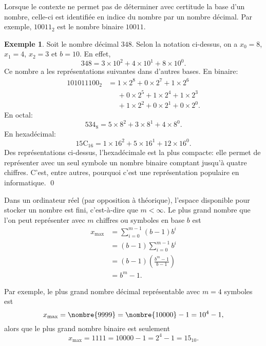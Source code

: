 \documentclass[letterpaper,11pt]{memoir}
\theoremstyle{plain}
\theoremstyle{definition}
\newtheorem{exemple}{Exemple}[chapter]
\theoremstyle{remark}
\begin{document}
Lorsque le contexte ne permet pas de déterminer avec certitude la base
d'un nombre, celle-ci est identifiée en indice du nombre par un nombre
décimal. Par exemple, $10011_2$ est le nombre binaire $10011$.

\begin{exemple}
  Soit le nombre décimal $348$. Selon la notation ci-dessus, on a $x_0 =
  8$, $x_1 = 4$, $x_2 = 3$ et $b = 10$. En effet,
  \begin{displaymath}
    348 = 3 \times 10^2 + 4 \times 10^1 + 8 \times 10^0.
  \end{displaymath}
  Ce nombre a les représentations suivantes dans d'autres bases. En binaire:
  \begin{align*}
    101011100_{2}
    &= 1 \times 2^8 + 0 \times 2^7 + 1 \times 2^6 \\
    &\phantom{=} + 0 \times 2^5 + 1 \times 2^4 + 1 \times 2^3 \\
    &\phantom{=} + 1 \times 2^2 + 0 \times 2^1 + 0 \times 2^0.
  \end{align*}
  En octal:
  \begin{equation*}
    534_{8} = 5 \times 8^2 + 3 \times 8^1 + 4 \times 8^0.
  \end{equation*}
  En hexadécimal:
  \begin{equation*}
    15\mathrm{C}_{16} = 1 \times 16^2 + 5 \times 16^1 + 12 \times 16^0.
  \end{equation*}
  Des représentations ci-dessus, l'hexadécimale est la plus compacte:
  elle permet de représenter avec un seul symbole un nombre binaire
  comptant jusqu'à quatre chiffres. C'est, entre autres, pourquoi
  c'est une représentation populaire en informatique.%
  \qed
\end{exemple}

Dans un ordinateur réel (par opposition à théorique), l'espace
disponible pour stocker un nombre est fini, c'est-à-dire que $m <
\infty$. Le plus grand nombre que l'on peut représenter avec $m$
chiffres ou symboles en base $b$ est
\begin{align*}
  x_{\text{max}}
  &= \sum_{i = 0}^{m - 1} (b - 1) b^i \\
  &= (b - 1) \sum_{i = 0}^{m - 1} b^i \\
  &= (b - 1)
  \left(
    \frac{b^m - 1}{b - 1}
  \right) \\
  &= b^m - 1.
\end{align*}

Par exemple, le plus grand nombre décimal représentable avec $m = 4$
symboles est
\begin{equation*}
  x_{\text{max}} = \nombre{9999} = \nombre{10000} - 1 = 10^4 - 1,
\end{equation*}
alors que le plus grand nombre binaire est seulement
\begin{equation*}
  x_{\text{max}} = 1111 = 10000 - 1 = 2^4 - 1 = 15_{10}.
\end{equation*}
\end{document}
